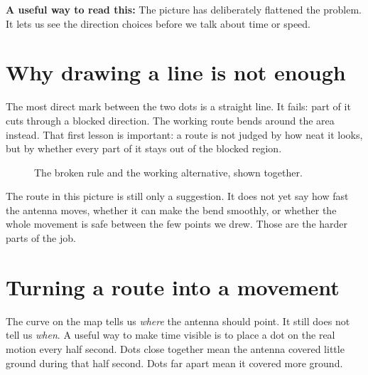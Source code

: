 \documentclass[10pt,letterpaper]{article}
\newcommand{\teachingnote}[1]{\begin{center}\begin{minipage}{.88\linewidth}\colorbox{papergray}{\parbox{.94\linewidth}{\small\textbf{A useful way to read this:} #1}}\end{minipage}\end{center}}
\begin{document}
\teachingnote{The picture has deliberately flattened the problem. It lets us see
the direction choices before we talk about time or speed.}

\section{Why drawing a line is not enough}

The most direct mark between the two dots is a straight line. It fails: part of
it cuts through a blocked direction. The working route bends around the area
instead. That first lesson is important: a route is not judged by how neat it
looks, but by whether every part of it stays out of the blocked region.

\begin{figure}[ht]
\centering
{}
\caption{The broken rule and the working alternative, shown together.}
\label{fig:line}
\end{figure}

The route in this picture is still only a suggestion. It does not yet say how
fast the antenna moves, whether it can make the bend smoothly, or whether the
whole movement is safe between the few points we drew. Those are the harder
parts of the job.

\clearpage

\section{Turning a route into a movement}

The curve on the map tells us \emph{where} the antenna should point. It still
does not tell us \emph{when}. A useful way to make time visible is to place a
dot on the real motion every half second. Dots close together mean the antenna
covered little ground during that half second. Dots far apart mean it covered
more ground.
\end{document}
